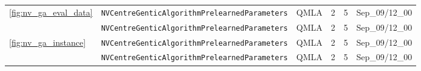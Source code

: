 \begin{tabular}{lllrrl}
\multirow{2}{*}{\cref{fig:nv_ga_eval_data}} & \texttt{NVCentreGenticAlgorithmPrelearnedParameters} &                                     QMLA &                                        2 &                                        5 &                           Sep\_09/12\_00 \\
                          & \texttt{NVCentreGenticAlgorithmPrelearnedParameters} &                                     QMLA &                                        2 &                                        5 &                           Sep\_09/12\_00 \\
\cline{1-6}
\multirow{2}{*}{\cref{fig:nv_ga_instance}} & \texttt{NVCentreGenticAlgorithmPrelearnedParameters} &                                     QMLA &                                        2 &                                        5 &                           Sep\_09/12\_00 \\
                          & \texttt{NVCentreGenticAlgorithmPrelearnedParameters} &                                     QMLA &                                        2 &                                        5 &                           Sep\_09/12\_00 \\
\hline
\end{tabular}
